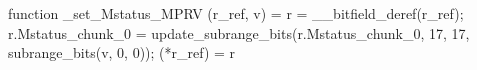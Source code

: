 function _set_Mstatus_MPRV (r_ref, v) = {
    r = __bitfield_deref(r_ref);
    r.Mstatus_chunk_0 = update_subrange_bits(r.Mstatus_chunk_0, 17, 17, subrange_bits(v, 0, 0));
    (*r_ref) = r
}
